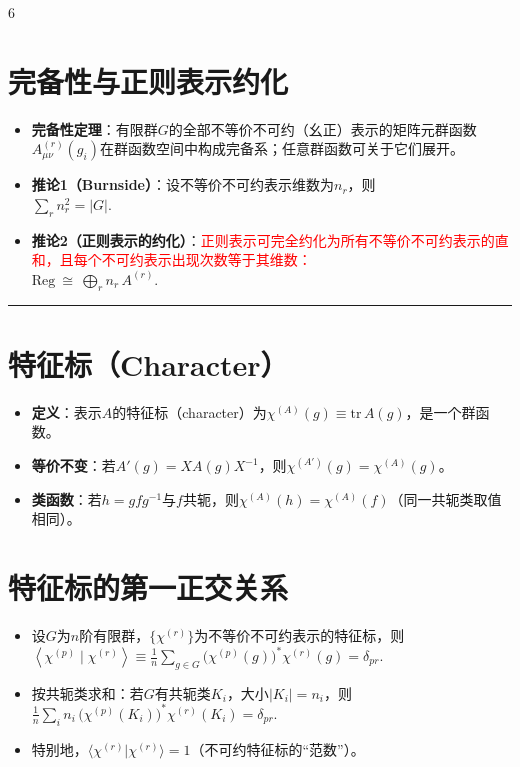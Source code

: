 \documentclass[landscape]{article}
\begin{document}
\begin{multicols*}{6}
\section*{完备性与正则表示约化}
\begin{itemize}
  \item \textbf{完备性定理}：有限群$G$的全部不等价不可约（幺正）表示的矩阵元群函数$A^{(r)}_{\mu\nu}(g_i)$在群函数空间中构成完备系；任意群函数可关于它们展开。
  \item \textbf{推论1（Burnside）}：设不等价不可约表示维数为$n_r$，则
  \\
  $
  \sum_r n_r^{2}=|G|.
  $
  \item \textbf{推论2（正则表示的约化）}：\textcolor{red}{正则表示可完全约化为所有不等价不可约表示的直和，且每个不可约表示出现次数等于其维数：}
  \\
  $
  \mathrm{Reg}\ \cong\ \bigoplus_{r} n_r\,A^{(r)}.
  $
\end{itemize}
\noindent\textcolor{red}{\rule{\linewidth}{1pt}}
\section*{特征标（Character）}
\begin{itemize}
  \item \textbf{定义}：表示$A$的特征标（character）为$\chi^{(A)}(g)\equiv \mathrm{tr}\,A(g)$，是一个群函数。
  \item \textbf{等价不变}：若$A'(g)=X A(g)X^{-1}$，则$\chi^{(A')}(g)=\chi^{(A)}(g)$。
  \item \textbf{类函数}：若$h=gfg^{-1}$与$f$共轭，则$\chi^{(A)}(h)=\chi^{(A)}(f)$（同一共轭类取值相同）。
\end{itemize}

\section*{特征标的第一正交关系}
\begin{itemize}
  \item 设$G$为$n$阶有限群，$\{\chi^{(r)}\}$为不等价不可约表示的特征标，则
  \\
  $
  \left\langle \chi^{(p)}\mid \chi^{(r)} \right\rangle
  \equiv \frac{1}{n}\sum_{g\in G}\big(\chi^{(p)}(g)\big)^{*}\chi^{(r)}(g)=\delta_{pr}.
  $
  \item 按共轭类求和：若$G$有共轭类$K_i$，大小$|K_i|=n_i$，则
  \\
  $
  \frac{1}{n}\sum_{i} n_i\,\big(\chi^{(p)}(K_i)\big)^{*}\chi^{(r)}(K_i)=\delta_{pr}.
  $
  \item 特别地，$\langle\chi^{(r)}|\chi^{(r)}\rangle=1$（不可约特征标的“范数”）。
\end{itemize}


\end{multicols*}
\end{document}
